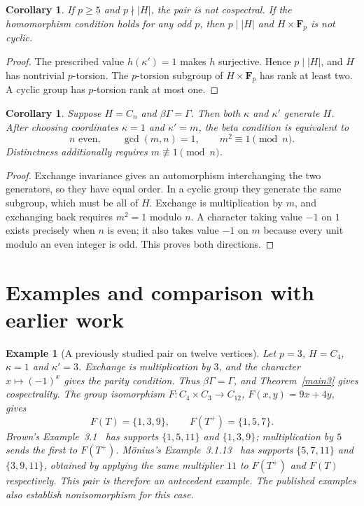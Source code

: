 \documentclass[11pt]{article}
\newtheorem{corollary}[theorem]{Corollary}
\newtheorem{example}[theorem]{Example}
\theoremstyle{remark}\newtheorem{remark}[theorem]{Remark}
\newcommand{\Fp}{\mathbf F_p}
\begin{document}
\begin{corollary}
If $p\geq5$ and $p\nmid|H|$, the pair is not cospectral. If the homomorphism condition holds for any odd $p$, then $p\mid|H|$ and $H\times\Fp$ is not cyclic.
\end{corollary}
\begin{proof}
The prescribed value $h(\kappa')=1$ makes $h$ surjective. Hence $p\mid|H|$, and $H$ has nontrivial $p$-torsion. The $p$-torsion subgroup of $H\times\Fp$ has rank at least two. A cyclic group has $p$-torsion rank at most one.
\end{proof}

\begin{corollary}\label{cyclicbeta}
Suppose $H=C_n$ and $\beta\Gamma=\Gamma$. Then both $\kappa$ and $\kappa'$ generate $H$. After choosing coordinates $\kappa=1$ and $\kappa'=m$, the beta condition is equivalent to
\[
n\text{ even},\qquad \gcd(m,n)=1,\qquad m^2\equiv1\pmod n.
\]
Distinctness additionally requires $m\not\equiv1\pmod n$.
\end{corollary}
\begin{proof}
Exchange invariance gives an automorphism interchanging the two generators, so they have equal order. In a cyclic group they generate the same subgroup, which must be all of $H$. Exchange is multiplication by $m$, and exchanging back requires $m^2=1$ modulo $n$. A character taking value $-1$ on $1$ exists precisely when $n$ is even; it also takes value $-1$ on $m$ because every unit modulo an even integer is odd. This proves both directions.
\end{proof}

\section{Examples and comparison with earlier work}
\begin{example}[A previously studied pair on twelve vertices]\label{twelve}
Let $p=3$, $H=C_4$, $\kappa=1$ and $\kappa'=3$. Exchange is multiplication by $3$, and the character $x\mapsto(-1)^x$ gives the parity condition. Thus $\beta\Gamma=\Gamma$, and Theorem~\ref{main3} gives cospectrality.
The group isomorphism $F:C_4\times C_3\to C_{12}$, $F(x,y)=9x+4y$, gives
\[
F(T)=\{1,3,9\},\qquad F(T^+)=\{1,5,7\}.
\]
Brown's Example~3.1~\cite{Brown} has supports $\{1,5,11\}$ and $\{1,3,9\}$; multiplication by $5$ sends the first to $F(T^+)$. M\"onius's Example~3.1.13~\cite{Moenius} has supports $\{5,7,11\}$ and $\{3,9,11\}$, obtained by applying the same multiplier $11$ to $F(T^+)$ and $F(T)$ respectively. This pair is therefore an antecedent example. The published examples also establish nonisomorphism for this case.
\end{example}
\end{document}
